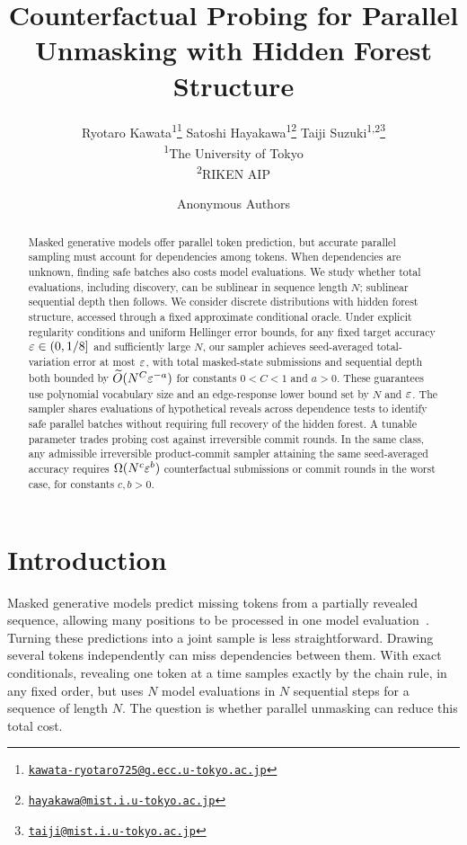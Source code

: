 \documentclass{article} %
\title{Counterfactual Probing for Parallel\\
Unmasking with Hidden Forest Structure}
\author{%
    Ryotaro Kawata\textsuperscript{1}\thanks{\href{mailto:kawata-ryotaro725@g.ecc.u-tokyo.ac.jp}{\nolinkurl{kawata-ryotaro725@g.ecc.u-tokyo.ac.jp}}}\qquad
    Satoshi Hayakawa\textsuperscript{1}\thanks{\href{mailto:hayakawa@mist.i.u-tokyo.ac.jp}{\nolinkurl{hayakawa@mist.i.u-tokyo.ac.jp}}}\qquad
    Taiji Suzuki\textsuperscript{1,2}\thanks{\href{mailto:taiji@mist.i.u-tokyo.ac.jp}{\nolinkurl{taiji@mist.i.u-tokyo.ac.jp}}}\\[0.5em]
    \normalsize\textsuperscript{1}The University of Tokyo\\
    \normalsize\textsuperscript{2}RIKEN AIP
  }
\date{}
\author{Anonymous Authors}
\begin{document}

\maketitle

\begin{abstract}
Masked generative models offer parallel token prediction, but accurate parallel
sampling must account for dependencies among tokens. When dependencies
are unknown, finding safe batches also costs model evaluations.
We study whether total evaluations, including discovery, can be sublinear
in sequence length $N$; sublinear sequential depth then follows.
We consider discrete distributions
with hidden forest structure, accessed through a fixed approximate conditional
oracle. Under explicit regularity conditions and uniform Hellinger error bounds,
for any fixed target accuracy $\varepsilon\in(0,1/8]$ and sufficiently
large $N$, our sampler achieves seed-averaged total-variation error at most
$\varepsilon$, with total masked-state submissions and sequential depth
both bounded by $\widetilde O(N^C\varepsilon^{-a})$ for constants
$0<C<1$ and $a>0$. These guarantees use polynomial vocabulary size and an
edge-response lower bound set by $N$ and $\varepsilon$.
The sampler shares evaluations of hypothetical reveals across dependence
tests to identify safe parallel batches without requiring full recovery
of the hidden forest. A tunable
parameter trades probing cost against irreversible commit rounds. In the same
class, any admissible irreversible product-commit sampler attaining
the same seed-averaged accuracy requires $\Omega(N^c\varepsilon^b)$ counterfactual submissions
or commit rounds in the worst case, for constants $c,b>0$.
\end{abstract}

\section{Introduction}
\label{sec:introduction}

Masked generative models predict missing tokens from a partially revealed
sequence, allowing many positions to be processed in one model
evaluation~\citep{austin2021structured,sahoo2024simple,nie2025large}.
Turning these predictions into a joint sample is less straightforward.
Drawing several tokens independently can miss dependencies between them.
With exact conditionals, revealing one token at a time samples exactly by
the chain rule, in any fixed order, but uses $N$ model evaluations in $N$
sequential steps for a sequence of length $N$.
The question is whether parallel unmasking can reduce this total cost.
\end{document}
